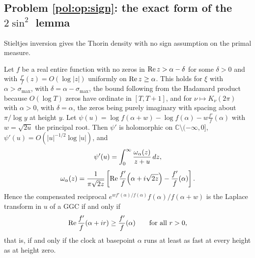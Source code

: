 \subsection{Problem \ref{pol:op:sign}: the exact form of the $2\sin^2$ lemma}

Stieltjes inversion gives the Thorin density with no sign assumption on the primal measure.

\begin{theorem}\label{pol:thm:exactlemma}
Let $f$ be a real entire function with no zeros in $\operatorname{Re} z>\alpha-\delta$ for some $\delta>0$ and with $\frac{f'}{f}(z)=O(\log|z|)$ uniformly on $\operatorname{Re} z\ge\alpha$. This holds for $\xi$ with $\alpha>\sigma_{\max}$, with $\delta=\alpha-\sigma_{\max}$, the bound following from the Hadamard product because $O(\log T)$ zeros have ordinate in $[T,T+1]$, and for $\nu\mapsto K_\nu(2\pi)$ with $\alpha>0$, with $\delta=\alpha$, the zeros being purely imaginary with spacing about $\pi/\log y$ at height $y$. Let $\psi(u)=\log f(\alpha+w)-\log f(\alpha)-w\frac{f'}{f}(\alpha)$ with $w=\sqrt{2u}$ the principal root. Then $\psi'$ is holomorphic on $\mathbb C\setminus(-\infty,0]$, $\psi'(u)=O(|u|^{-1/2}\log|u|)$, and
\begin{equation}\label{pol:eq:stieltjes}
\begin{gathered}
\psi'(u)=\int_0^\infty\frac{\omega_\alpha(z)}{z+u}\,dz,\\[4pt]
\omega_\alpha(z)=\frac{1}{\pi\sqrt{2z}}\left[\operatorname{Re}\frac{f'}{f}\!\left(\alpha+i\sqrt{2z}\right)-\frac{f'}{f}(\alpha)\right].
\end{gathered}
\end{equation}
Hence the compensated reciprocal $e^{wf'(\alpha)/f(\alpha)}f(\alpha)/f(\alpha+w)$ is the Laplace transform in $u$ of a GGC if and only if
\begin{equation}\label{pol:eq:exactlemma}
\operatorname{Re}\frac{f'}{f}(\alpha+ir)\ge\frac{f'}{f}(\alpha)\qquad\text{for all } r>0,
\end{equation}
that is, if and only if the clock at basepoint $\alpha$ runs at least as fast at every height as at height zero.
\end{theorem}

